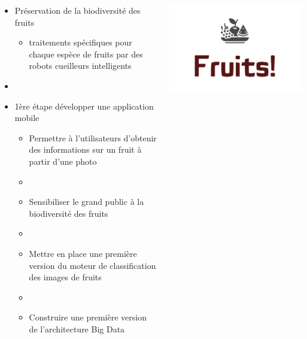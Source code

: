 \documentclass[8pt,aspectratio=169,hyperref={unicode=true}]{beamer}
\begin{document}
\begin{frame}{\insertsubsection}
  \begin{columns}
    \begin{column}{.6\textwidth}
      \begin{itemize}
        \item Préservation de la biodiversité des fruits
              \begin{itemize}
                \item traitements spécifiques pour chaque espèce de fruits par des robots cueilleurs intelligents
              \end{itemize}
        \item[]
        \item 1ère étape développer une application mobile
              \begin{itemize}
                \item Permettre à l'utilisateurs d'obtenir des informations sur un fruit à partir d'une photo
                \item[]
                \item Sensibiliser le grand public à la biodiversité des fruits
                \item[]
                \item Mettre en place une première version du moteur de classification des images de fruits
                \item[]
                \item Construire une première version de l'architecture Big Data
              \end{itemize}
      \end{itemize}

    \end{column}
    \begin{column}{.4\textwidth}
      \includegraphics[width=\textwidth]{./Logo projet big data.png}
    \end{column}
  \end{columns}
\end{frame}
\end{document}
